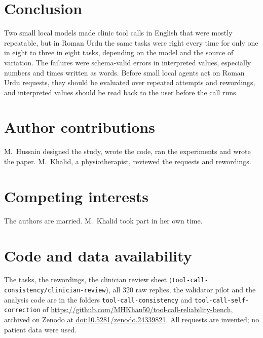 \documentclass[11pt,a4paper]{article}
\newcommand{\code}[1]{\texttt{#1}}
\begin{document}
\section{Conclusion}

Two small local models made clinic tool calls in English that were mostly repeatable, but in Roman Urdu the same
tasks were right every time for only one in eight to three in eight tasks, depending on the model and the source of
variation. The failures were schema-valid errors in interpreted values, especially numbers and times written as
words. Before small local agents act on Roman Urdu requests, they should be evaluated over repeated attempts and
rewordings, and interpreted values should be read back to the user before the call runs.

\section*{Author contributions}
M.\ Hussain designed the study, wrote the code, ran the experiments and wrote the paper. M.\ Khalid, a physiotherapist, reviewed the requests and rewordings.

\section*{Competing interests}
The authors are married. M.\ Khalid took part in her own time.

\section*{Code and data availability}

The tasks, the rewordings, the clinician review sheet (\code{tool-call-consistency/clinician-review}), all 320 raw replies, the validator pilot and the analysis code are in the folders
\code{tool-call-consistency} and \code{tool-call-self-correction} of \url{https://github.com/MHKhan50/tool-call-reliability-bench},
archived on Zenodo at \href{https://doi.org/10.5281/zenodo.24339821}{doi:10.5281/zenodo.24339821}.
All requests are invented; no patient data were used.



\end{document}
